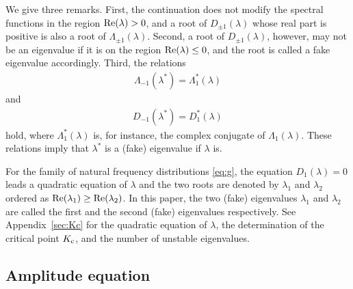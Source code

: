 We give three remarks.
First, the continuation does not modify the spectral functions
in the region ${\rm Re}(\lambda)>0$,
and a root of $D_{\pm 1}(\lambda)$ whose real part is positive
is also a root of $\Lambda_{\pm 1}(\lambda)$.
Second, a root of $D_{\pm 1}(\lambda)$, however, may not be an eigenvalue
if it is on the region ${\rm Re}(\lambda)\leq 0$,
and the root is called a fake eigenvalue accordingly.
Third, the relations
\begin{align}
  \Lambda_{-1}(\lambda^{\ast}) = \Lambda_{1}^{\ast}(\lambda)
  \label{eq:relation-Lambda}
\end{align}
and 
\begin{align}
  D_{-1}(\lambda^{\ast}) = D_{1}^{\ast}(\lambda)
  \label{eq:relation-D}
\end{align}
hold, where $\Lambda_{1}^{\ast}(\lambda)$ is, for instance,
the complex conjugate of $\Lambda_{1}(\lambda)$.
These relations imply that $\lambda^{\ast}$ is a (fake) eigenvalue
if $\lambda$ is.

For the family of natural frequency distributions \eqref{eq:g},
the equation $D_{1}(\lambda)=0$ leads a quadratic equation
of $\lambda$ and the two roots are denoted by $\lambda_{1}$ and $\lambda_{2}$
ordered as ${\rm Re}(\lambda_{1})\geq {\rm Re}(\lambda_{2})$.
In this paper, the two (fake) eigenvalues $\lambda_{1}$ and $\lambda_{2}$
are called the first and the second (fake) eigenvalues respectively.
See Appendix~\ref{sec:Kc} for the quadratic equation of $\lambda$,
the determination of the critical point $K_{\rm c}$,
and the number of unstable eigenvalues.


\subsection{Amplitude equation}
\label{sec:amplitude-equation}

